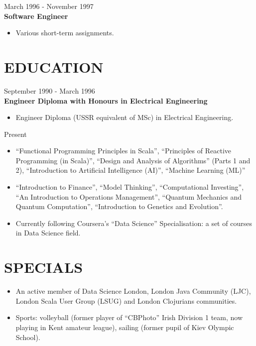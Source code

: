 \documentclass{res}
\begin{document}
\begin{resume}
 \hfill        March 1996 - November 1997\\
{\bf Software Engineer}
\begin{itemize} \itemsep -2pt %
 \item Various short-term assignments.
\end{itemize}

\section{EDUCATION}
 \hfill        September 1990 - March 1996\\
{\bf Engineer Diploma with Honours in Electrical Engineering}
\begin{itemize} \itemsep -2pt %
 \item Engineer Diploma (USSR equivalent of MSc) in Electrical Engineering.
\end{itemize}
 \hfill        Present
\begin{itemize} \itemsep -2pt %
 \item ``Functional Programming Principles in Scala'', ``Principles of Reactive Programming (in Scala)'', ``Design and Analysis of Algorithms'' (Parts 1 and 2), ``Introduction to Artificial Intelligence (AI)'', ``Machine Learning (ML)''
 \item ``Introduction to Finance'', ``Model Thinking'', ``Computational Investing'', ``An Introduction to Operations Management'', ``Quantum Mechanics and Quantum Computation'', ``Introduction to Genetics and Evolution''.
 \item Currently following Coursera’s ``Data Science'' Specialisation: a set of courses in Data Science field.
\end{itemize}

\section{SPECIALS}
\begin{itemize}
 \item An active member of Data Science London, London Java Community (LJC), London Scala User Group (LSUG) and London Clojurians communities.
 \item Sports: volleyball (former player of ``CBPhoto'' Irish Division 1 team, now playing in Kent amateur league), sailing (former pupil of Kiev Olympic School).
\end{itemize}


\end{resume}
\end{document}
